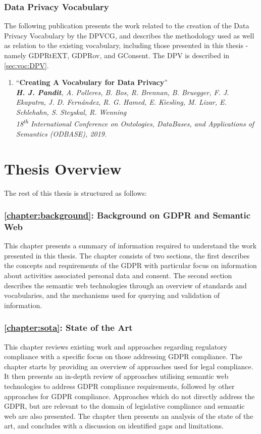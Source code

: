 \subsubsection{Data Privacy Vocabulary}
The following publication presents the work related to the creation of the Data Privacy Vocabulary by the DPVCG, and describes the methodology used as well as relation to the existing vocabulary, including those presented in this thesis - namely GDPRtEXT, GDPRov, and GConsent. The DPV is described in \autoref{sec:voc:DPV}.
\begin{enumerate}[resume]
    \item ``\textbf{Creating A Vocabulary for Data Privacy}'' \cite{pandit_creating_2019} \\
    \textit{\textbf{H. J. Pandit}, A. Polleres, B. Bos, R. Brennan, B. Bruegger, F. J. Ekaputra, J. D. Fernández, R. G. Hamed, E. Kiesling, M. Lizar, E. Schlehahn, S. Steyskal, R. Wenning} \\
    \textit{18\textsuperscript{th} International Conference on Ontologies, DataBases, and Applications of Semantics (ODBASE), 2019.}
\end{enumerate}


\section{Thesis Overview}
The rest of this thesis is structured as follows:

\subsubsection*{\autoref{chapter:background}: Background on GDPR and Semantic Web}
This chapter presents a summary of information required to understand the work presented in this thesis. The chapter consists of two sections, the first describes the concepts and requirements of the GDPR with particular focus on information about activities associated personal data and consent. The second section describes the semantic web technologies through an overview of standards and vocabularies, and the mechanisms used for querying and validation of information.

\subsubsection*{\autoref{chapter:sota}: State of the Art}
This chapter reviews existing work and approaches regarding regulatory compliance with a specific focus on those addressing GDPR compliance. The chapter starts by providing an overview of approaches used for legal compliance. It then presents an in-depth review of approaches utilising semantic web technologies to address GDPR compliance requirements, followed by other approaches for GDPR compliance. Approaches which do not directly address the GDPR, but are relevant to the domain of legislative compliance and semantic web are also presented. The chapter then presents an analysis of the state of the art, and concludes with a discussion on identified gaps and limitations.


